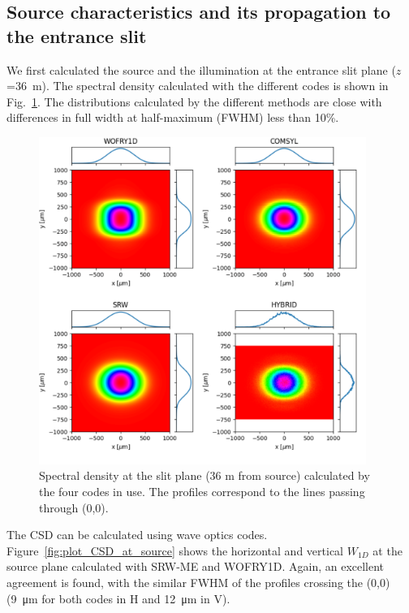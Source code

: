 \documentclass{iucr}              %
\begin{document}
\subsection{Source characteristics and its propagation to the entrance slit}
\label{sec:results36m}

We first calculated the source and the illumination at the entrance slit plane ($z$=\SI{36}{\meter}).
The spectral density calculated with the different codes is shown in Fig.~\ref{fig:plot_2D_spectral_density_36m}. The distributions calculated by the different methods are close with differences in full width at half-maximum (FWHM) less than 10\%.

\begin{figure}
    \label{fig:plot_2D_spectral_density_36m}
    \includegraphics[width=0.95\textwidth]{figures/plot_2D_spectral_density_36m.pdf}
    \caption{Spectral density at the slit plane (36 m from source) calculated by the four codes in use. The profiles correspond to the lines passing through (0,0).
    }
\end{figure}

The CSD can be calculated using wave optics codes. 
Figure~\ref{fig:plot_CSD_at_source} shows the horizontal and vertical $W_{1D}$ at the source plane calculated with SRW-ME and WOFRY1D.
Again, an excellent agreement is found, with the similar FWHM of the profiles crossing the (0,0) (\SI{9}{\micro\meter} for both codes in H and \SI{12}{\micro\meter} in V).
\end{document}
